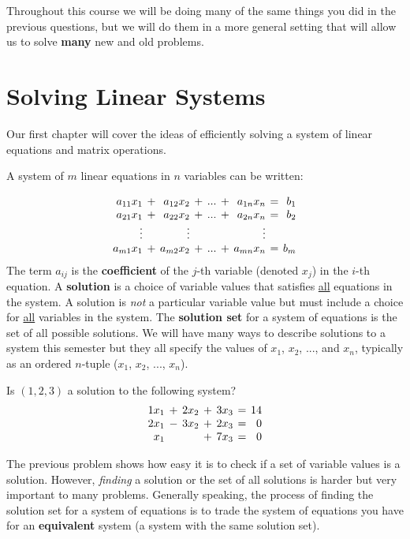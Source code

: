 Throughout this course we will be doing many of the same things you did in the previous questions, but we will do them in a more general setting that will allow us to solve \textbf{many} new and old problems.

\newpage
\section{Solving Linear Systems}
Our first chapter will cover the ideas of efficiently solving a system of linear equations and matrix operations.

A system of $m$ linear equations in $n$ variables can be written:

\begin{equation*}
\setlength{\arraycolsep}{2pt}
\begin{array}{rcrcrcrcr}
  a_{11} x_1  &+& a_{12} x_2 &+& ... &+&  a_{1n}x_n &=& b_1 \\
  a_{21} x_1  &+& a_{22} x_2 &+& ... &+&  a_{2n}x_n &=& b_2 \\
  \vdots  & & \vdots & &  & &  \vdots &&  \\
  a_{m1} x_1  &+& a_{m2} x_2 &+& ... &+&  a_{mn}x_n &=& b_m
\end{array}
\end{equation*}
The term $a_{ij}$ is the \textbf{coefficient} of the $j$-th variable (denoted $x_j$) in the $i$-th equation. A \textbf{solution} is a choice of variable values that satisfies \underline{all} equations in the system. A solution is \emph{not} a particular variable value but must include a choice for \underline{all} variables in the system. The \textbf{solution set} for a system of equations is the set of all possible solutions. We will have many ways to describe solutions to a system this semester but they all specify the values of $x_1$, $x_2$, ..., and $x_n$, typically as an ordered $n$-tuple ($x_1$, $x_2$, ..., $x_n$).

\bq Is $(1,2,3)$ a solution to the following system?
\begin{equation*}
\setlength{\arraycolsep}{2pt}
\begin{array}{rcrcrcrcr}
  1 x_1  &+& 2 x_2 &+& 3 x_3 &=& 14 \\ %
  2 x_1  &-& 3 x_2 &+& 2 x_3 &=& 0 \\
   x_1   & &       &+& 7 x_3 &=& 0
\end{array}
\end{equation*}
\eq

The previous problem shows how easy it is to check if a set of variable values is a solution. However, \emph{finding} a solution or the set of all solutions is harder but very important to many problems. Generally speaking, the process of finding the solution set for a system of equations is to trade the system of equations you have for an \textbf{equivalent} system (a system with the same solution set).


